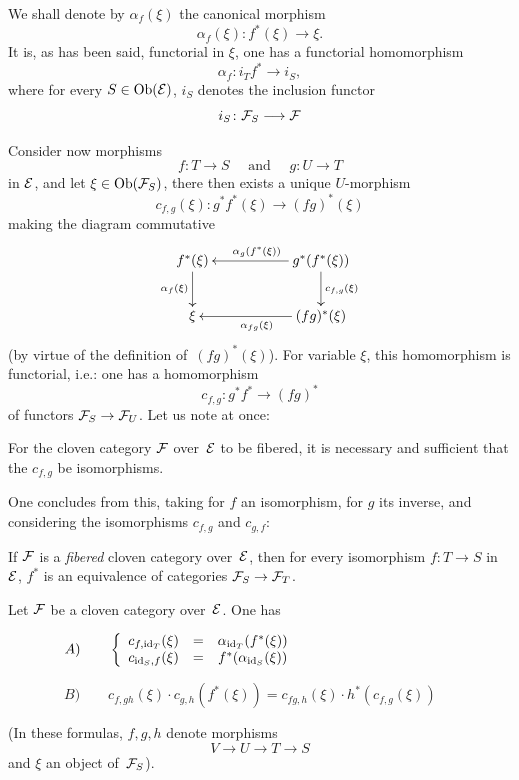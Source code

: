 We shall denote by $\alpha_f(\xi)$ the canonical morphism
$$
\alpha_f(\xi)\colon f^*(\xi)\to\xi.
$$
It is, as has been said, functorial in $\xi$, \ie one has a functorial
homomorphism
$$
\alpha_f\colon i_Tf^*\to i_S,
$$
where for every $S\in\Ob(\cal{E})$, $i_S$ denotes the inclusion
functor
$$
i_S\colon\cal{F}_S\to \cal{F}
$$

Consider now morphisms
$$
f\colon T\to S\quad\text{ and }\quad g\colon U\to T
$$
in $\cal{E}$, and let $\xi\in\Ob(\cal{F}_S)$, there then exists a
unique $U$-morphism
$$
c_{f,g}(\xi)\colon g^*f^*(\xi)\to (fg)^*(\xi)
$$
making
the diagram commutative
$$
\xymatrix{
f^*(\xi) \ar[d]_{\alpha_f(\xi)} & & \ar[ll]_{\alpha_g(f^*(\xi))}
g^*(f^*(\xi)) \ar[d]^{c_{f,g}(\xi)} \\
\xi & & \ar[ll]^{\alpha_{fg}(\xi)} (fg)^*(\xi) }
$$
(by virtue of the definition of~$(fg)^*(\xi)$). For variable $\xi$,
this homomorphism is functorial, {i.e.}: one has a homomorphism
$$
c_{f,g}\colon g^*f^*\to (fg)^*
$$
of functors $\cal{F}_S\to\cal{F}_U$. Let us note at once:
\begin{proposition}
\label{VI.7.2} For the cloven category $\cal{F}$
over~$\cal{E}$ to be fibered, it is necessary and sufficient that the $c_{f,g}$
be isomorphisms.
\end{proposition}

One concludes from this, taking for $f$ an isomorphism, for $g$ its inverse,
and considering the isomorphisms $c_{f,g}$ and $c_{g,f}$:
\begin{corollary}
\label{VI.7.3} If $\cal{F}$ is a \emph{fibered}
cloven category over~$\cal{E}$, then for every isomorphism $f\colon T\to
S$ in $\cal{E}$, $f^*$ is an equivalence of categories
$\cal{F}_S\to \cal{F}_T$.
\end{corollary}

\begin{proposition}
\label{VI.7.4} Let $\cal{F}$ be a cloven category over~$\cal{E}$.
One has

$\qquad\qquad A)\qquad
\left\{\begin{array}{ccc}c_{f,\id_T}(\xi)&=&\alpha_{\id_T}(f^*(\xi))\\
c_{\id_S,f}(\xi)&=&f^*(\alpha_{\id_S}(\xi))
\end{array}\right.$

\smallskip
$\qquad\qquad B)\qquad c_{f,gh}(\xi)\cdot
c_{g,h}(f^*(\xi))=c_{fg,h}(\xi)\cdot h^*(c_{f,g}(\xi))$

\noindent(In
these formulas, $f,g,h$ denote morphisms
$$
V\to U\to T\to S
$$
and $\xi$ an object of~$\cal{F}_S$).
\end{proposition}

